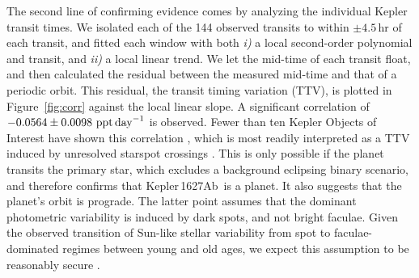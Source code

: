 \documentclass[12pt,modern,twocolumn,tighten]{aastex63}
\newcommand{\pn}{Kepler\,1627Ab} %
\begin{document}

The second line of confirming evidence comes by analyzing the
individual Kepler transit times. We isolated each of the 144 observed
transits to within $\pm4.5$\,hr of each transit, and fitted each
window with both {\it i)} a local second-order polynomial and transit,
and {\it ii)} a local linear trend.  We let the mid-time of each
transit float, and then calculated the residual between the measured
mid-time and that of a periodic orbit.  This residual, the transit
timing variation (TTV), is plotted in Figure~\ref{fig:corr} against
the local linear slope.  A significant correlation of $-0.0564 \pm
0.0098\ {\rm ppt\,day}^{-1}$ is observed.  Fewer than ten Kepler
Objects of Interest have shown this correlation
\citep{holczer_time_2015}, which is most readily interpreted as a TTV
induced by unresolved starspot crossings \citep{mazeh_time_2015}.
This is only possible if the planet transits the primary star, which
excludes a background eclipsing binary scenario, and therefore
confirms that \pn\ is a planet.  It also suggests that the planet's
orbit is prograde.  The latter point assumes that the dominant
photometric variability is induced by dark spots, and not bright
faculae.  Given the observed transition of Sun-like stellar
variability from spot to faculae-dominated regimes between young and
old ages, we expect this assumption to be reasonably secure
\citep{shapiro_are_2016,montet_long-term_2017,reinhold_stellar_2020}.
\end{document}
